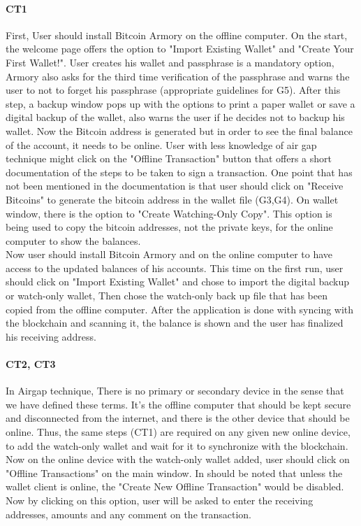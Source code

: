 \paragraph{CT1} 
First, User should install Bitcoin Armory on the offline computer. On the start, the welcome page offers the option to "Import Existing Wallet" and "Create Your First Wallet!". User creates his wallet and passphrase is a mandatory option, Armory also asks for the third time verification of the passphrase and warns the user to not to forget his passphrase (appropriate guidelines for G5). After this step, a backup window pops up with the options to print a paper wallet or save a digital backup of the wallet, also warns the user if he decides not to backup his wallet. Now the Bitcoin address is generated but in order to see the final balance of the account, it needs to be online. User with less knowledge of air gap technique might click on the "Offline Transaction" button that offers a short documentation of the steps to be taken to sign a transaction. One point that has not been mentioned in the documentation is that user should click on "Receive Bitcoins" to generate the bitcoin address in the wallet file (G3,G4). On wallet window, there is the option to "Create Watching-Only Copy". This option is being used to copy the bitcoin addresses, not the private keys, for the online computer to show the balances.\\
Now user should install Bitcoin Armory and \bitcoinclient on the online computer to have access to the updated balances of his accounts. This time on the first run, user should click on "Import Existing Wallet" and chose to import the digital backup or watch-only wallet, Then chose the watch-only back up file that has been copied from the offline computer. After the application is done with syncing with the blockchain and scanning it, the balance is shown and the user has finalized his receiving address.


\paragraph{CT2, CT3} 
In Airgap technique, There is no primary or secondary device in the sense that we have defined these terms. It's the offline computer that should be kept secure and disconnected from the internet, and there is the other device that should be online. Thus, the same steps (CT1) are required on any given new online device, to add the watch-only wallet and wait for it to synchronize with the blockchain.\\
Now on the online device with the watch-only wallet added, user should click on "Offline Transactions" on the main window. In should be noted that unless the wallet client is online, the "Create New Offline Transaction" would be disabled. Now by clicking on this option, user will be asked to enter the receiving addresses, amounts and any comment on the transaction.


